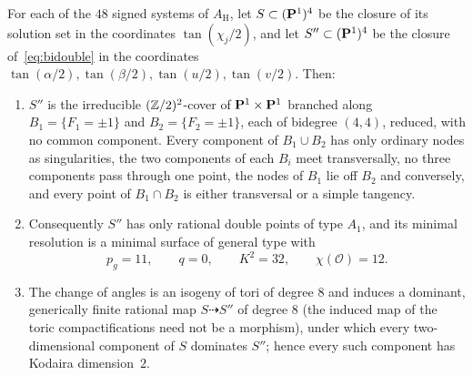 \begin{theorem}\label{thm:gentype}
For each of the $48$ signed systems of $A_{\mathrm H}$, let $S\subset(\mathbf P^1)^4$ be the closure of its solution set in the
coordinates $\tan(\chi_j/2)$, and let $S''\subset(\mathbf P^1)^4$ be the closure of~\eqref{eq:bidouble} in the coordinates
$\tan(\alpha/2),\tan(\beta/2),\tan(u/2),\tan(v/2)$. Then:
\begin{enumerate}
\item $S''$ is the irreducible $(\mathbb Z/2)^2$-cover of $\mathbf P^1\times\mathbf P^1$ branched along $B_1=\{F_1=\pm1\}$ and
$B_2=\{F_2=\pm1\}$, each of bidegree $(4,4)$, reduced, with no common component. Every component of $B_1\cup B_2$ has only
ordinary nodes as singularities, the two components of each $B_i$ meet transversally, no three components pass through
one point, the nodes of $B_1$ lie off $B_2$ and conversely, and every point of $B_1\cap B_2$ is either transversal or a
simple tangency.
\item Consequently $S''$ has only rational double points of type $A_1$, and its minimal resolution is a minimal surface of
general type with
\[
p_g=11,\qquad q=0,\qquad K^2=32,\qquad \chi(\mathcal O)=12 .
\]
\item The change of angles is an isogeny of tori of degree $8$ and induces a dominant, generically finite rational map
$S\dashrightarrow S''$ of degree $8$ (the induced map of the toric compactifications need not be a morphism), under which
every two-dimensional component of $S$ dominates $S''$; hence every such component has Kodaira dimension~$2$.
\end{enumerate}
\end{theorem}

